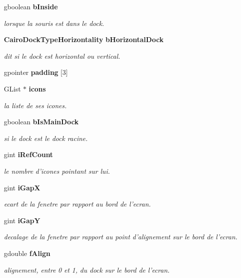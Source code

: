 \begin{CompactItemize}
gboolean {\bf bInside}
\begin{CompactList}\small\item\em lorsque la souris est dans le dock. \item\end{CompactList}\item 
{\bf CairoDockTypeHorizontality} {\bf bHorizontalDock}
\begin{CompactList}\small\item\em dit si le dock est horizontal ou vertical. \item\end{CompactList}\item 
gpointer {\bf padding} [3]
\item 
GList $\ast$ {\bf icons}
\begin{CompactList}\small\item\em la liste de ses icones. \item\end{CompactList}\item 
gboolean {\bf bIsMainDock}
\begin{CompactList}\small\item\em si le dock est le dock racine. \item\end{CompactList}\item 
gint {\bf iRefCount}
\begin{CompactList}\small\item\em le nombre d'icones pointant sur lui. \item\end{CompactList}\item 
gint {\bf iGapX}
\begin{CompactList}\small\item\em ecart de la fenetre par rapport au bord de l'ecran. \item\end{CompactList}\item 
gint {\bf iGapY}
\begin{CompactList}\small\item\em decalage de la fenetre par rapport au point d'alignement sur le bord de l'ecran. \item\end{CompactList}\item 
gdouble {\bf fAlign}
\begin{CompactList}\small\item\em alignement, entre 0 et 1, du dock sur le bord de l'ecran. \item\end{CompactList}\item 

\end{CompactItemize}
